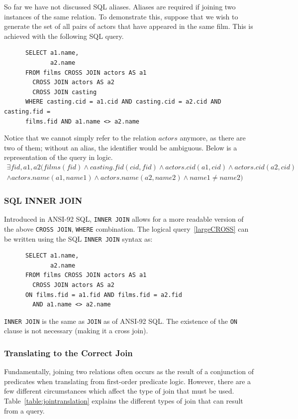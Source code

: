 \documentclass[a4paper, 11pt]{article}
\begin{document}
      So far we have not discussed SQL aliases. Aliases are required if joining
      two instances of the same relation. To demonstrate this, suppose that we
      wish to generate the set of all pairs of actors that have appeared in the
      same film. This is achieved with the following SQL query.
      \begin{verbatim}
      SELECT a1.name,
             a2.name
      FROM films CROSS JOIN actors AS a1
        CROSS JOIN actors AS a2
        CROSS JOIN casting
      WHERE casting.cid = a1.cid AND casting.cid = a2.cid AND casting.fid =
      films.fid AND a1.name <> a2.name
      \end{verbatim}
      Notice that we cannot simply refer to the relation $actors$ anymore, as
      there are two of them; without an alias, the identifier would be
      ambiguous. Below is a representation of the query in logic.
      \begin{multline}
        \label{largeCROSS}
        \exists fid, a1, a2(films(fid) \land casting.fid(cid, fid) \land
          actors.cid(a1, cid) \land actors.cid(a2, cid) \\
        \land actors.name(a1, name1) \land actors.name(a2, name2) \land
          name1 \neq name2)
      \end{multline}

    \subsubsection{SQL INNER JOIN}
      Introduced in ANSI-92 SQL, \texttt{INNER JOIN} allows for a more readable
      version of the above \texttt{CROSS JOIN}, \texttt{WHERE} combination. The
      logical query~\ref{largeCROSS} can be written using the SQL \texttt{INNER
      JOIN}
      syntax as:
      \begin{verbatim}
      SELECT a1.name,
             a2.name
      FROM films CROSS JOIN actors AS a1
        CROSS JOIN actors AS a2
      ON films.fid = a1.fid AND films.fid = a2.fid
        AND a1.name <> a2.name
      \end{verbatim}
      \texttt{INNER JOIN} is the same as \texttt{JOIN} as of ANSI-92 SQL. The
      existence of the \texttt{ON} clause is not necessary (making it a cross
      join).

    \subsubsection{Translating to the Correct Join}
      Fundamentally, joining two relations often occurs as the result of a
      conjunction of predicates when translating from first-order predicate
      logic. However, there are a few different circumstances which affect the
      type of join that must be used. Table~\ref{table:jointranslation} explains
      the different types of join that can result from a query.
\end{document}
